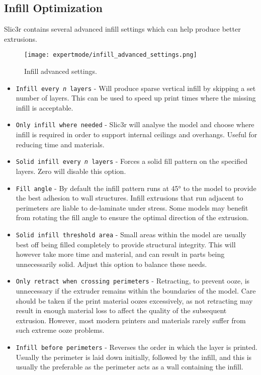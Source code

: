 

\subsection{Infill Optimization} %
\label{sec:infill_optimization}

Slic3r contains several advanced infill settings which can help produce better extrusions.

\begin{figure}[H]
\centering
\texttt{[image: expertmode/infill\_advanced\_settings.png]}
\caption{Infill advanced settings.}
\label{fig:infill_settings}
\end{figure}

\begin{itemize}
    \item \texttt{Infill every \textit{n} layers} - Will produce sparse vertical infill by skipping a set number of layers. This can be used to speed up print times where the missing infill is acceptable.
    \item \texttt{Only infill where needed} - Slic3r will analyse the model and choose where infill is required in order to support internal ceilings and overhangs.  Useful for reducing time and materials.
    \item \texttt{Solid infill every \textit{n} layers} - Forces a solid fill pattern on the specified layers.  Zero will disable this option.
    \item \texttt{Fill angle} - By default the infill pattern runs at 45° to the model to provide the best adhesion to wall structures.  Infill extrusions that run adjacent to perimeters are liable to de-laminate under stress.  Some models may benefit from rotating the fill angle to ensure the optimal direction of the extrusion.
    \item \texttt{Solid infill threshold area} - Small areas within the model are usually best off being filled completely to provide structural integrity.  This will however take more time and material, and can result in parts being unnecessarily solid.  Adjust this option to balance these needs.
    \item \texttt{Only retract when crossing perimeters} - Retracting, to prevent ooze, is unnecessary if the extruder remains within the boundaries of the model.  Care should be taken if the print material oozes excessively, as not retracting may result in enough material loss to affect the quality of the subsequent extrusion.  However, most modern printers and materials rarely suffer from such extreme ooze problems.
    \item \texttt{Infill before perimeters} - Reverses the order in which the layer is printed. Usually the perimeter is laid down initially, followed by the infill, and this is usually the preferable as the perimeter acts as a wall containing the infill.
\end{itemize}


